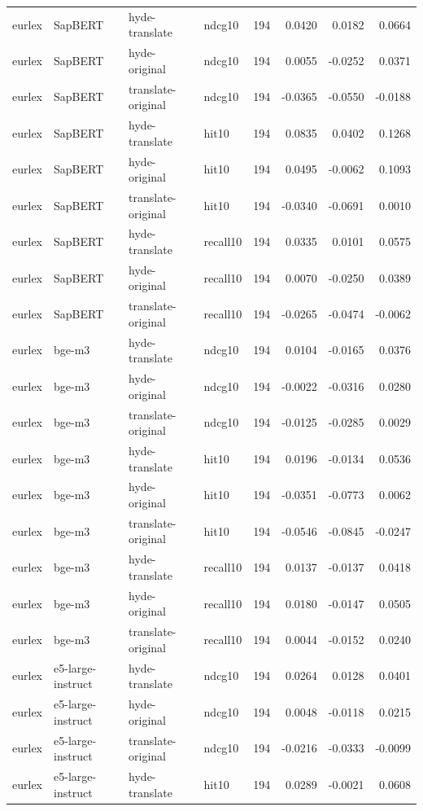 \begin{tabular}{llllrrrr}
eurlex & SapBERT & hyde-translate & ndcg10 & 194 & 0.0420 & 0.0182 & 0.0664 \\
eurlex & SapBERT & hyde-original & ndcg10 & 194 & 0.0055 & -0.0252 & 0.0371 \\
eurlex & SapBERT & translate-original & ndcg10 & 194 & -0.0365 & -0.0550 & -0.0188 \\
eurlex & SapBERT & hyde-translate & hit10 & 194 & 0.0835 & 0.0402 & 0.1268 \\
eurlex & SapBERT & hyde-original & hit10 & 194 & 0.0495 & -0.0062 & 0.1093 \\
eurlex & SapBERT & translate-original & hit10 & 194 & -0.0340 & -0.0691 & 0.0010 \\
eurlex & SapBERT & hyde-translate & recall10 & 194 & 0.0335 & 0.0101 & 0.0575 \\
eurlex & SapBERT & hyde-original & recall10 & 194 & 0.0070 & -0.0250 & 0.0389 \\
eurlex & SapBERT & translate-original & recall10 & 194 & -0.0265 & -0.0474 & -0.0062 \\
eurlex & bge-m3 & hyde-translate & ndcg10 & 194 & 0.0104 & -0.0165 & 0.0376 \\
eurlex & bge-m3 & hyde-original & ndcg10 & 194 & -0.0022 & -0.0316 & 0.0280 \\
eurlex & bge-m3 & translate-original & ndcg10 & 194 & -0.0125 & -0.0285 & 0.0029 \\
eurlex & bge-m3 & hyde-translate & hit10 & 194 & 0.0196 & -0.0134 & 0.0536 \\
eurlex & bge-m3 & hyde-original & hit10 & 194 & -0.0351 & -0.0773 & 0.0062 \\
eurlex & bge-m3 & translate-original & hit10 & 194 & -0.0546 & -0.0845 & -0.0247 \\
eurlex & bge-m3 & hyde-translate & recall10 & 194 & 0.0137 & -0.0137 & 0.0418 \\
eurlex & bge-m3 & hyde-original & recall10 & 194 & 0.0180 & -0.0147 & 0.0505 \\
eurlex & bge-m3 & translate-original & recall10 & 194 & 0.0044 & -0.0152 & 0.0240 \\
eurlex & e5-large-instruct & hyde-translate & ndcg10 & 194 & 0.0264 & 0.0128 & 0.0401 \\
eurlex & e5-large-instruct & hyde-original & ndcg10 & 194 & 0.0048 & -0.0118 & 0.0215 \\
eurlex & e5-large-instruct & translate-original & ndcg10 & 194 & -0.0216 & -0.0333 & -0.0099 \\
eurlex & e5-large-instruct & hyde-translate & hit10 & 194 & 0.0289 & -0.0021 & 0.0608 \\

\end{tabular}
